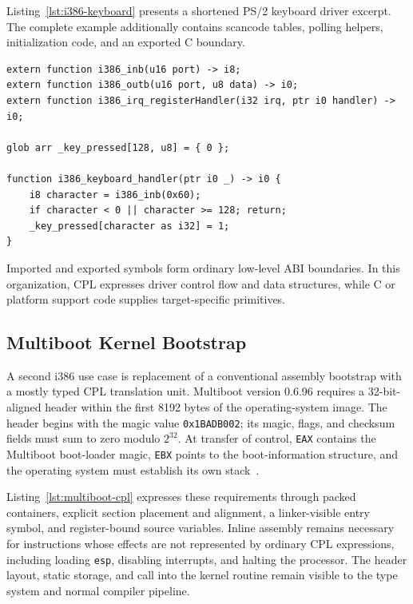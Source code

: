 \documentclass[10pt,twocolumn]{article}
\begin{document}
\par Listing~\ref{lst:i386-keyboard} presents a shortened PS/2 keyboard driver excerpt. The complete example additionally contains scancode tables, polling helpers, initialization code, and an exported C boundary.

\begin{lstlisting}[language=CPL,caption={Shortened i386 PS/2 keyboard driver excerpt using C externs.},label={lst:i386-keyboard}]
extern function i386_inb(u16 port) -> i8;
extern function i386_outb(u16 port, u8 data) -> i0;
extern function i386_irq_registerHandler(i32 irq, ptr i0 handler) -> i0;

glob arr _key_pressed[128, u8] = { 0 };

function i386_keyboard_handler(ptr i0 _) -> i0 {
    i8 character = i386_inb(0x60);
    if character < 0 || character >= 128; return;
    _key_pressed[character as i32] = 1;
}
\end{lstlisting}

\par Imported and exported symbols form ordinary low-level ABI boundaries. In this organization, CPL expresses driver control flow and data structures, while C or platform support code supplies target-specific primitives.

\subsection{Multiboot Kernel Bootstrap}
\label{sec:multiboot}

\par A second i386 use case is replacement of a conventional assembly bootstrap with a mostly typed CPL translation unit. Multiboot version 0.6.96 requires a 32-bit-aligned header within the first 8192 bytes of the operating-system image. The header begins with the magic value \texttt{0x1BADB002}; its magic, flags, and checksum fields must sum to zero modulo \(2^{32}\). At transfer of control, \texttt{EAX} contains the Multiboot boot-loader magic, \texttt{EBX} points to the boot-information structure, and the operating system must establish its own stack~\cite{multiboot096}.
\par Listing~\ref{lst:multiboot-cpl} expresses these requirements through packed containers, explicit section placement and alignment, a linker-visible entry symbol, and register-bound source variables. Inline assembly remains necessary for instructions whose effects are not represented by ordinary CPL expressions, including loading \texttt{esp}, disabling interrupts, and halting the processor. The header layout, static storage, and call into the kernel routine remain visible to the type system and normal compiler pipeline.
\end{document}
